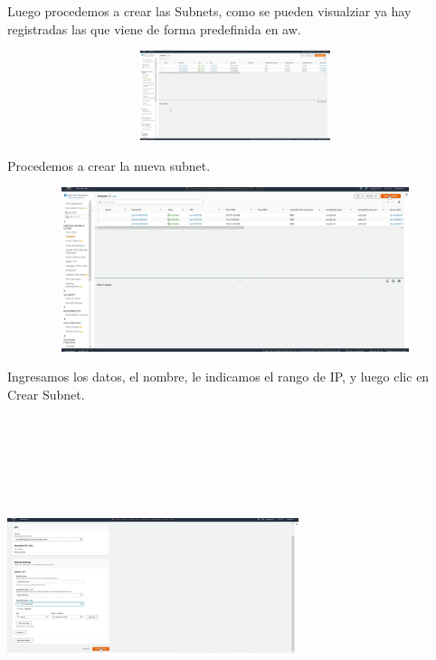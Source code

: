 \documentclass{article} %
\begin{document}
\noindent 

\noindent 

\noindent 

\noindent 

\noindent 

\noindent 

\noindent Luego procedemos a crear las Subnets, como se pueden visualziar ya hay registradas las que viene de forma predefinida en aw. 

\noindent 

\noindent \includegraphics*[width=6.45in, height=1.03in, trim=0.62in 2.22in 0.09in 0.14in]{image5}

\noindent 

\noindent Procedemos a crear la nueva subnet. 

\noindent 

\noindent \includegraphics*[width=5.41in, height=1.89in, trim=7.04in 3.87in 0.00in 0.22in]{image6}

\noindent 

\noindent Ingresamos los datos, el nombre, le indicamos el rango de IP, y luego clic en Crear Subnet. 

\noindent 

\noindent \includegraphics*[width=3.35in, height=3.89in, trim=0.00in 0.00in 5.58in 0.17in]{image7}
\end{document}
